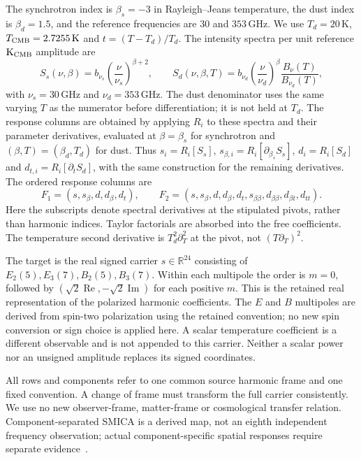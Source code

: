 \documentclass[aps,prd,onecolumn,11pt,nofootinbib,notitlepage]{revtex4-2}
\newcommand{\R}{\mathbb R}
\begin{document}
The synchrotron index is $\beta_s=-3$ in Rayleigh--Jeans temperature, the dust index is $\beta_d=1.5$, and the reference frequencies are $30$ and $353\,\mathrm{GHz}$. We use $T_d=20\,\mathrm K$, $T_{\rm CMB}=2.7255\,\mathrm K$ and $t=(T-T_d)/T_d$. The intensity spectra per unit reference $\mathrm K_{\rm CMB}$ amplitude are
\begin{equation}
 S_s(\nu,\beta)=b_{\nu_s}\left(\frac{\nu}{\nu_s}\right)^{\beta+2},\qquad
 S_d(\nu,\beta,T)=b_{\nu_d}\left(\frac{\nu}{\nu_d}\right)^\beta
                  \frac{B_\nu(T)}{B_{\nu_d}(T)},
 \label{eq:spectra}
\end{equation}
with $\nu_s=30\,\mathrm{GHz}$ and $\nu_d=353\,\mathrm{GHz}$. The dust denominator uses the same varying $T$ as the numerator before differentiation; it is not held at $T_d$. The response columns are obtained by applying $R_i$ to these spectra and their parameter derivatives, evaluated at $\beta=\beta_s$ for synchrotron and $(\beta,T)=(\beta_d,T_d)$ for dust. Thus $s_i=R_i[S_s]$, $s_{\beta,i}=R_i[\partial_{\beta_s}S_s]$, $d_i=R_i[S_d]$ and $d_{t,i}=R_i[\partial_tS_d]$, with the same construction for the remaining derivatives. The ordered response columns are
\begin{equation}
 F_1=(s,s_\beta,d,d_\beta,d_t),\qquad
 F_2=(s,s_\beta,d,d_\beta,d_t,s_{\beta\beta},d_{\beta\beta},d_{\beta t},d_{tt}).
 \label{eq:columns}
\end{equation}
Here the subscripts denote spectral derivatives at the stipulated pivots, rather than harmonic indices. Taylor factorials are absorbed into the free coefficients. The temperature second derivative is $T_d^2\partial_T^2$ at the pivot, not $(T\partial_T)^2$.

The target is the real signed carrier $s\in\R^{24}$ consisting of $E_2(5),E_3(7),B_2(5),B_3(7)$. Within each multipole the order is $m=0$, followed by $(\sqrt2\operatorname{Re},-\sqrt2\operatorname{Im})$ for each positive $m$. This is the retained real representation of the polarized harmonic coefficients. The $E$ and $B$ multipoles are derived from spin-two polarization using the retained convention; no new spin conversion or sign choice is applied here. A scalar temperature coefficient is a different observable and is not appended to this carrier. Neither a scalar power nor an unsigned amplitude replaces its signed coordinates.

All rows and components refer to one common source harmonic frame and one fixed convention. A change of frame must transform the full carrier consistently. We use no new observer-frame, matter-frame or cosmological transfer relation. Component-separated SMICA is a derived map, not an eighth independent frequency observation; actual component-specific spatial responses require separate evidence~\cite{Planck2018IV}.
\end{document}
